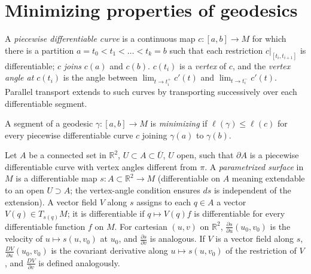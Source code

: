 \section{Minimizing properties of geodesics}

\begin{definition}
  \label{def:dc-ch3-3-1}

  A \emph{piecewise differentiable curve} is a continuous map $c:[a,b]\to M$ for which
  there is a partition $a=t_0<t_1<\dots<t_k=b$ such that each restriction
  $c|_{[t_i,t_{i+1}]}$ is differentiable; $c$ \emph{joins} $c(a)$ and $c(b)$. $c(t_i)$ is
  a \emph{vertex} of $c$, and the \emph{vertex angle at $c(t_i)$} is the angle between
  $\lim_{t\to t_i^+}c'(t)$ and $\lim_{t\to t_i^-}c'(t)$. Parallel transport extends
  to such curves by transporting successively over each differentiable segment.
\end{definition}

\begin{definition}
  \label{def:dc-ch3-3-2}


  A segment of a geodesic $\gamma:[a,b]\to M$ is \emph{minimizing} if
  $\ell(\gamma)\le\ell(c)$ for every piecewise differentiable curve $c$ joining
  $\gamma(a)$ to $\gamma(b)$.
\end{definition}

\begin{definition}
  \label{def:dc-ch3-3-3}


  Let $A$ be a connected set in $\mathbb{R}^2$, $U\subset A\subset\overline{U}$, $U$
  open, such that $\partial A$ is a piecewise differentiable curve with vertex
  angles different from $\pi$. A \emph{parametrized surface} in $M$ is a differentiable
  map $s:A\subset\mathbb{R}^2\to M$ (differentiable on $A$ meaning extendable to an
  open $U\supset A$; the vertex-angle condition ensures $ds$ is independent of the
  extension). A vector field $V$ along $s$ assigns to each $q\in A$ a vector
  $V(q)\in T_{s(q)}M$; it is differentiable if $q\mapsto V(q)f$ is differentiable
  for every differentiable function $f$ on $M$. For cartesian $(u,v)$ on
  $\mathbb{R}^2$, $\frac{\partial s}{\partial u}(u_0,v_0)$ is the velocity of
  $u\mapsto s(u,v_0)$ at $u_0$, and $\frac{\partial s}{\partial v}$ is analogous.
  If $V$ is a vector field along $s$, $\frac{DV}{\partial u}(u_0,v_0)$ is the
  covariant derivative along $u\mapsto s(u,v_0)$ of the restriction of $V$, and
  $\frac{DV}{\partial v}$ is defined analogously.
\end{definition}

